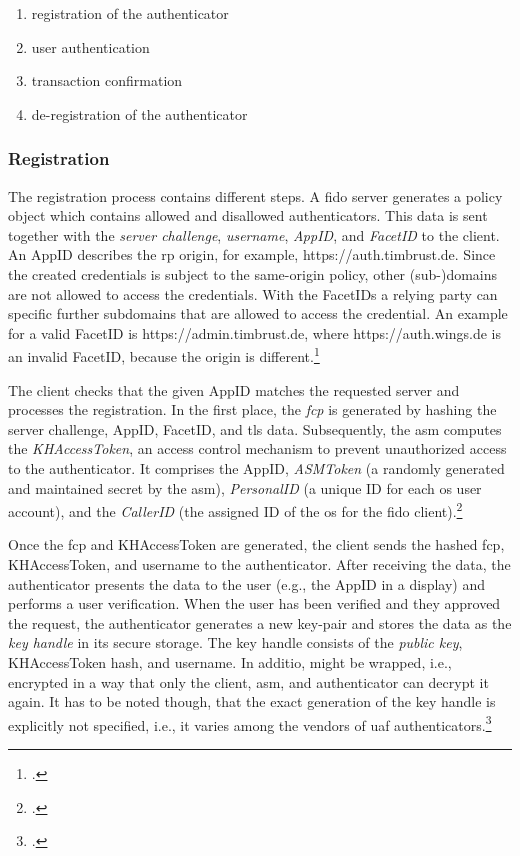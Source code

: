 \begin{enumerate}
	\item registration of the authenticator
	\item user authentication
	\item transaction confirmation
	\item de-registration of the authenticator
\end{enumerate}

\subsubsection{Registration}

The registration process contains different steps. A \gls{fido} server generates a policy object which contains allowed and disallowed authenticators. This data is sent together with the \textit{server challenge}, \textit{username}, \textit{AppID}, and \textit{FacetID} to the client. An AppID describes the \gls{rp} origin, for example, \frqq https://auth.timbrust.de\flqq. Since the created credentials is subject to the same-origin policy, other (sub-)domains are not allowed to access the credentials. With the FacetIDs a relying party can specific further subdomains that are allowed to access the credential. An example for a valid FacetID is \frqq https://admin.timbrust.de\flqq, where \frqq https://auth.wings.de\flqq{} is an invalid FacetID, because the origin is different.\footcites[See][131--132]{10.1007/978-3-319-67639-5_11}[See][17--19]{uaf-protocol}[See][3--4]{uaf-appid-facets}

The client checks that the given AppID matches the requested server and processes the registration. In the first place, the \textit{\gls{fcp}} is generated by hashing the server challenge, AppID, FacetID, and \gls{tls} data. Subsequently, the \gls{asm} computes the \textit{KHAccessToken}, an access control mechanism to prevent unauthorized access to the authenticator. It comprises the AppID, \textit{ASMToken} (a randomly generated and maintained secret by the \gls{asm}), \textit{PersonalID} (a unique ID for each \gls{os} user account), and the \textit{CallerID} (the assigned ID of the \gls{os} for the \gls{fido} client).\footcites[See][131--132]{10.1007/978-3-319-67639-5_11}[See][17--19]{uaf-protocol}

Once the \gls{fcp} and KHAccessToken are generated, the client sends the hashed \gls{fcp}, KHAccessToken, and username to the authenticator. After receiving the data, the authenticator presents the data to the user (e.g., the AppID in a display) and performs a user verification. When the user has been verified and they approved the request, the authenticator generates a new key-pair and stores the data as the \textit{key handle} in its secure storage. The key handle consists of the \textit{public key}, KHAccessToken hash, and username. In additio, might be wrapped, i.e., encrypted in a way that only the client, \gls{asm}, and authenticator can decrypt it again. It has to be noted though, that the exact generation of the key handle is explicitly not specified, i.e., it varies among the vendors of \gls{uaf} authenticators.\footcites[See][9, 16--17]{uaf-asm}

